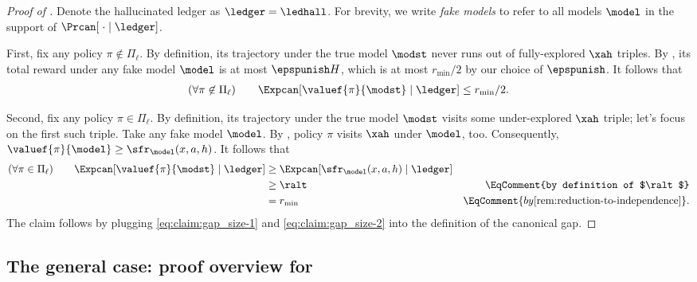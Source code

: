 \begin{proof}[Proof of ]
Denote the hallucinated ledger as $\ledger = \ledhall$. For brevity, we write \emph{fake models} to refer to all models $\model$ in the support of
    $\Prcan[\;\cdot \mid \ledger]$.

First, fix any policy $\pi\not\in \Pi_\ell$. By definition, its trajectory under the true model $\modst$ never runs out of fully-explored $\xah$ triples. By , its total reward under any fake model $\model$ is at most $\epspunish H$, which is at most $r_{\min}/2$ by our choice of $\epspunish$. It follows that
\begin{align}\label{eq:claim:gap_size-1}
(\forall \pi\not\in\Pi_\ell) \qquad
    \Expcan[\valuef{\pi}{\modst} \mid \ledger] \leq r_{\min}/2.
\end{align}

Second, fix any policy $\pi \in \Pi_{\ell}$. By definition, its trajectory under the true model $\modst$ visits some under-explored $\xah$ triple; let's focus on the first such triple. Take any fake model $\model$. By , policy $\pi$ visits $\xah$ under $\model$, too. Consequently,
    $\valuef{\pi}{\model} \geq \sfr_{\model}(x,a,h)$.
It follows that
\begin{align}
(\forall \pi\in\Pi_\ell)\qquad
\Expcan[\valuef{\pi}{\modst} \mid \ledger]
    &\geq \Expcan[\sfr_{\model}(x,a,h) \mid \ledger] \nonumber \\
    &\geq \ralt
    &\EqComment{by definition of $\ralt$} \nonumber\\
    &= r_{\min}
    &\EqComment{by \Cref{rem:reduction-to-independence}}.
    \label{eq:claim:gap_size-2}
\end{align}
The claim follows by plugging \eqref{eq:claim:gap_size-1} and \eqref{eq:claim:gap_size-2} into the definition of the canonical gap.
\end{proof}


\subsection{The general case: proof overview for }
\label{sec:probab_proof}



